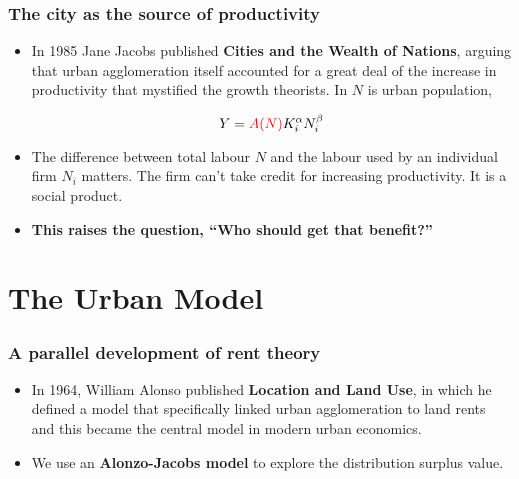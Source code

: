 \documentclass[notes]{beamer}
\begin{document}
\begin{frame}\frametitle{The city as the source of productivity}
\begin{itemize}

\item In 1985 Jane Jacobs published \textbf{Cities and the Wealth of Nations}, arguing that urban agglomeration itself accounted for a great deal of the increase in productivity that mystified the growth theorists. In $N$ is urban population,

\[Y=  \textcolor{red} {A(N)}K_i^\alpha N_i^\beta\]

\item The difference between total labour $N$ and the labour used by an individual firm  $N_i$  matters. The firm can't take credit for increasing productivity. It is a social product.

\item \textbf{This raises the question, ``Who should get that benefit?''}

\end {itemize}

\end{frame}


\section{The Urban Model}%
\begin{frame}\frametitle{A parallel development of rent theory}
\begin{itemize} 

\item In 1964, William Alonso published \textbf{Location and Land Use}, in which he defined a model %
that specifically linked urban agglomeration to land rents and this became the central model in modern urban economics.

\item We use an \textbf{Alonzo-Jacobs model} to explore the distribution surplus value.
\end {itemize}
\end{frame}
\end{document}
